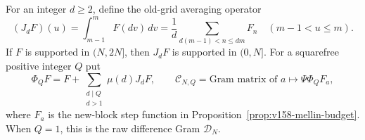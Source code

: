\documentclass[11pt]{article}
\theoremstyle{remark}
\begin{document}
For an integer $d\geq2$, define the old-grid averaging operator
\begin{equation}
 (J_dF)(u)=\int_{m-1}^{m}F(dv)\,dv
 =\frac1d\sum_{d(m-1)<n\leq dm}F_n
 \quad(m-1<u\leq m).
 \label{eq:ns60-cell-average}
\end{equation}
If $F$ is supported in $(N,2N]$, then $J_dF$ is supported in $(0,N]$.
For a squarefree positive integer $Q$ put
\begin{equation}
 \Phi_QF=F+\sum_{\substack{d\mid Q\\d>1}}\mu(d)J_dF,
 \qquad
 \mathcal C_{N,Q}=\text{Gram matrix of }a\longmapsto\Psi\Phi_QF_a,
 \label{eq:ns60-euler-correction}
\end{equation}
where $F_a$ is the new-block step function in
Proposition~\ref{prop:v158-mellin-budget}. When $Q=1$, this is the raw
difference Gram $\mathcal D_N$.
\end{document}
